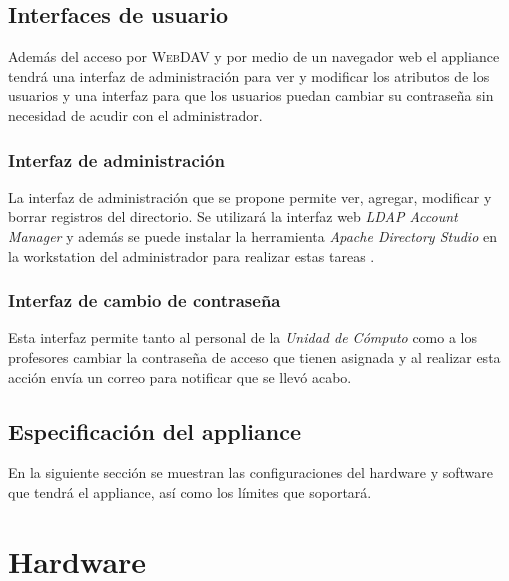       \subsection {Interfaces de usuario}

Adem\'{a}s del acceso por \textsc{WebDAV} y por medio de un navegador web el appliance tendr\'{a} una interfaz de administraci\'{o}n para ver y modificar los atributos de los usuarios y una interfaz para que los usuarios puedan cambiar su contrase\~{n}a sin necesidad de acudir con el administrador.

        \subsubsection {Interfaz de administraci\'{o}n}

La interfaz de administraci\'{o}n que se propone permite ver, agregar, modificar y borrar registros del directorio. Se utilizar\'{a} la interfaz web \textit{LDAP Account Manager} y adem\'{a}s se puede instalar la herramienta \textit{Apache Directory Studio} en la workstation del administrador para realizar  estas tareas .

        \subsubsection {Interfaz de cambio de contrase\~{n}a}

Esta interfaz permite tanto al personal de la \textit{Unidad de C\'{o}mputo} como a los profesores cambiar la contrase\~{n}a de acceso que tienen asignada y al realizar esta acci\'{o}n env\'{i}a un correo para notificar que se llev\'{o} acabo.

    \subsection {Especificaci\'{o}n del appliance}

En la siguiente secci\'{o}n se muestran las configuraciones del hardware y software que tendr\'{a} el appliance, as\'{i} como los l\'{i}mites que soportar\'{a}.

      \section {Hardware}


